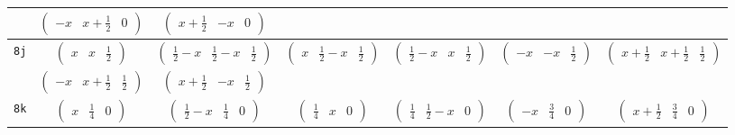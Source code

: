 \documentclass[fleqn,9pt,landscape]{jsarticle}
\begin{document}
\begin{center}
\begin{longtable}{ccccccc}
& $ \begin{pmatrix} - x & x + \frac{1}{2} & 0 \end{pmatrix} $ & $ \begin{pmatrix} x + \frac{1}{2} & - x & 0 \end{pmatrix} $ & $  $ & $  $ & $  $ & $  $ \\ \hline
{\tt 8j} & $ \begin{pmatrix} x & x & \frac{1}{2} \end{pmatrix} $ & $ \begin{pmatrix} \frac{1}{2} - x & \frac{1}{2} - x & \frac{1}{2} \end{pmatrix} $ & $ \begin{pmatrix} x & \frac{1}{2} - x & \frac{1}{2} \end{pmatrix} $ & $ \begin{pmatrix} \frac{1}{2} - x & x & \frac{1}{2} \end{pmatrix} $ & $ \begin{pmatrix} - x & - x & \frac{1}{2} \end{pmatrix} $ & $ \begin{pmatrix} x + \frac{1}{2} & x + \frac{1}{2} & \frac{1}{2} \end{pmatrix} $ \\
& $ \begin{pmatrix} - x & x + \frac{1}{2} & \frac{1}{2} \end{pmatrix} $ & $ \begin{pmatrix} x + \frac{1}{2} & - x & \frac{1}{2} \end{pmatrix} $ & $  $ & $  $ & $  $ & $  $ \\ \hline
{\tt 8k} & $ \begin{pmatrix} x & \frac{1}{4} & 0 \end{pmatrix} $ & $ \begin{pmatrix} \frac{1}{2} - x & \frac{1}{4} & 0 \end{pmatrix} $ & $ \begin{pmatrix} \frac{1}{4} & x & 0 \end{pmatrix} $ & $ \begin{pmatrix} \frac{1}{4} & \frac{1}{2} - x & 0 \end{pmatrix} $ & $ \begin{pmatrix} - x & \frac{3}{4} & 0 \end{pmatrix} $ & $ \begin{pmatrix} x + \frac{1}{2} & \frac{3}{4} & 0 \end{pmatrix} $ \\

\end{longtable}
\end{center}
\end{document}
